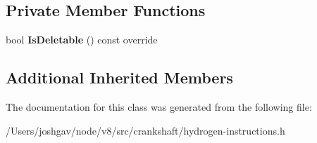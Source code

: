 \subsection*{Private Member Functions}
\begin{DoxyCompactItemize}
\item 
bool {\bfseries Is\+Deletable} () const  override\hypertarget{classv8_1_1internal_1_1_h_bitwise_binary_operation_a4f4f3e64528aec8ab80245c0d74afbfb}{}\label{classv8_1_1internal_1_1_h_bitwise_binary_operation_a4f4f3e64528aec8ab80245c0d74afbfb}

\end{DoxyCompactItemize}
\subsection*{Additional Inherited Members}


The documentation for this class was generated from the following file\+:\begin{DoxyCompactItemize}
\item 
/\+Users/joshgav/node/v8/src/crankshaft/hydrogen-\/instructions.\+h\end{DoxyCompactItemize}
